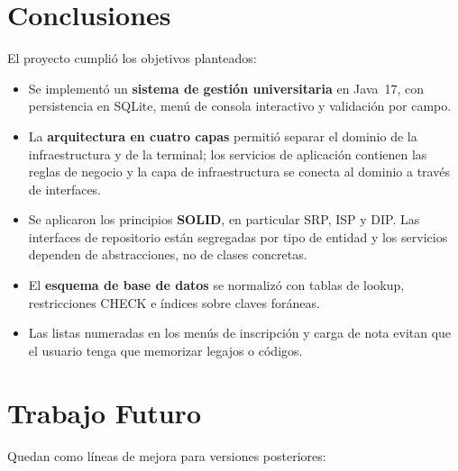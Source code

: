 \documentclass[12pt,a4paper]{article}
\begin{document}
\section{Conclusiones}

El proyecto cumplió los objetivos planteados:

\begin{itemize}
    \item Se implementó un \textbf{sistema de gestión universitaria}
        en Java~17, con persistencia en SQLite, menú de consola interactivo
        y validación por campo.
    \item La \textbf{arquitectura en cuatro capas} permitió separar el
        dominio de la infraestructura y de la terminal; los servicios de
        aplicación contienen las reglas de negocio y la capa de
        infraestructura se conecta al dominio a través de interfaces.
    \item Se aplicaron los principios \textbf{SOLID}, en particular SRP,
        ISP y DIP. Las interfaces de repositorio están segregadas por tipo
        de entidad y los servicios dependen de abstracciones, no de clases
        concretas.
    \item El \textbf{esquema de base de datos} se normalizó con tablas de
        lookup, restricciones CHECK e índices sobre claves foráneas.
    \item Las listas numeradas en los menús de inscripción y carga de nota
        evitan que el usuario tenga que memorizar legajos o códigos.
\end{itemize}

\section{Trabajo Futuro}

Quedan como líneas de mejora para versiones posteriores:
\end{document}
